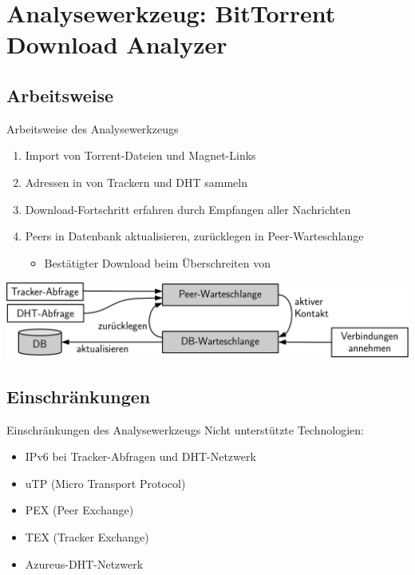 \documentclass[dvipsnames]{beamer} %
\begin{document}
	\section[BitTorrent Download Analyzer]{Analysewerkzeug: \glqq BitTorrent Download Analyzer\grqq }
	\subsection{Arbeitsweise}
	\begin{frame}{Arbeitsweise des Analysewerkzeugs}
		\begin{enumerate}
			\item \alert{Import} von Torrent-Dateien und Magnet-Links
			\item \alert{Adressen} in von Trackern und DHT sammeln
			\item \alert{Download-Fortschritt} erfahren durch Empfangen aller Nachrichten
			\item Peers in \alert{Datenbank} aktualisieren, zurücklegen in Peer-Warteschlange
			\begin{itemize}
				\item Bestätigter Download beim Überschreiten von 
			\end{itemize}
		\end{enumerate}

		\vspace{0.7cm}
    \includegraphics[width=\textwidth]{components-crop}
	\end{frame}

	\subsection{Einschränkungen}
	\begin{frame}{Einschränkungen des Analysewerkzeugs}
		Nicht unterstützte Technologien:

		\begin{itemize}
			\item IPv6 bei Tracker-Abfragen und DHT-Netzwerk
			\item uTP (Micro Transport Protocol)
			\item PEX (Peer Exchange)
			\item TEX (Tracker Exchange)
			\item Azureus-DHT-Netzwerk
		\end{itemize}
	\end{frame}
\end{document}
